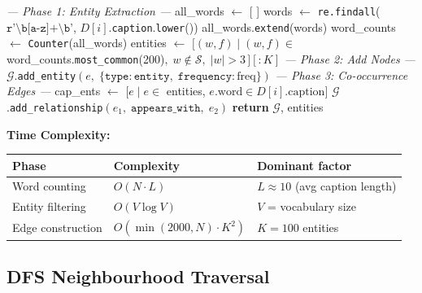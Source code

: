 \documentclass[12pt, a4paper]{article}
\theoremstyle{definition}
\theoremstyle{plain}
\theoremstyle{remark}
\begin{document}
\begin{algorithm}[H]
\caption{KG Construction from Captions --- Algorithm 2}
\label{alg:kg_build}
\begin{algorithmic}[1]
\Statex
{}
  \Statex \textit{--- Phase 1: Entity Extraction ---}
  \State all\_words $\gets$ [ ]
    \State words $\gets$ \texttt{re.findall}($\texttt{r'\textbackslash b[a-z]+\textbackslash b'}$,\; $D[i]$.\texttt{caption}.\texttt{lower}())
    \State all\_words.\texttt{extend}(words)
  \EndFor
  \State word\_counts $\gets$ \texttt{Counter}(all\_words)
  \State entities $\gets$ $[(w,f) \mid (w,f) \in$ word\_counts.\texttt{most\_common}(200)$,\;
         w\notin\mathcal{S},\;|w|>3\,][:K]$
  \Statex
  \Statex \textit{--- Phase 2: Add Nodes ---}
    \State $\mathcal{G}$.\texttt{add\_entity}$(e,\;\{\texttt{type}\!:\!\texttt{entity},\;\texttt{frequency}\!:\!\mathrm{freq}\})$
  \EndFor
  \Statex
  \Statex \textit{--- Phase 3: Co-occurrence Edges ---}
    \State cap\_ents $\gets$ $[e \mid e \in$ entities, $e.\text{word} \in D[i].\text{caption}]$
      \State $\mathcal{G}$.\texttt{add\_relationship}$(e_1,\;\texttt{appears\_with},\;e_2)$
    \EndFor
  \EndFor
  \State \textbf{return} $\mathcal{G}$, entities
\EndProcedure
\end{algorithmic}
\end{algorithm}

\noindent\textbf{Time Complexity:}
\begin{center}
\begin{tabular}{@{}lll@{}}
\toprule
\textbf{Phase} & \textbf{Complexity} & \textbf{Dominant factor} \\
\midrule
Word counting      & $O(N\cdot L)$            & $L\approx10$ (avg caption length) \\
Entity filtering   & $O(V\log V)$             & $V$ = vocabulary size \\
Edge construction  & $O(\min(2000,N)\cdot K^2)$ & $K=100$ entities \\
\bottomrule
\end{tabular}
\end{center}

\subsection{DFS Neighbourhood Traversal}
\end{document}
